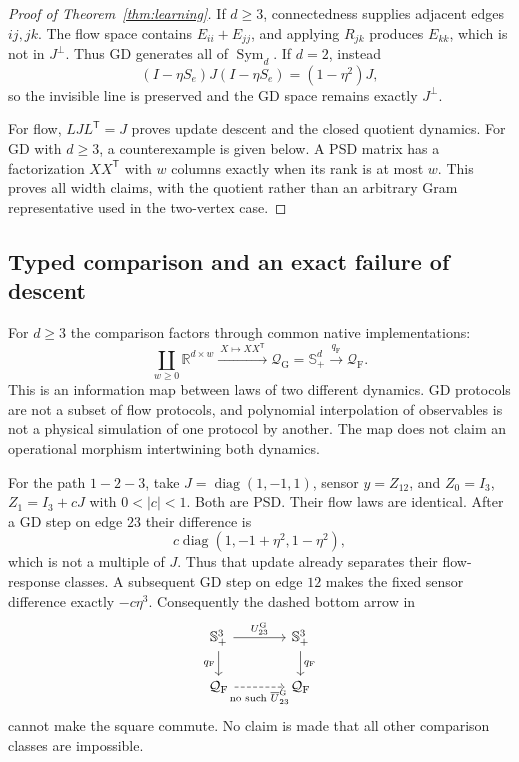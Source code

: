 \documentclass[11pt]{article}
\theoremstyle{remark}
\newcommand{\RR}{\mathbb R}
\newcommand{\Sym}{\operatorname{Sym}}
\newcommand{\diag}{\operatorname{diag}}
\newcommand{\PSD}{\mathbb S_+}
\newcommand{\QQF}{\mathcal Q_{\mathrm F}}
\newcommand{\QQG}{\mathcal Q_{\mathrm G}}
\begin{document}
\begin{proof}[Proof of Theorem~\ref{thm:learning}]
If $d\geq3$, connectedness supplies adjacent edges $ij,jk$. The flow space contains $E_{ii}+E_{jj}$, and applying $R_{jk}$ produces $E_{kk}$, which is not in $J^\perp$. Thus GD generates all of $\Sym_d$. If $d=2$, instead
\[
 (I-\eta S_e)J(I-\eta S_e)=(1-\eta^2)J,
\]
so the invisible line is preserved and the GD space remains exactly $J^\perp$.

For flow, $LJL^{\mathsf T}=J$ proves update descent and the closed quotient dynamics. For GD with $d\geq3$, a counterexample is given below. A PSD matrix has a factorization $XX^{\mathsf T}$ with $w$ columns exactly when its rank is at most $w$. This proves all width claims, with the quotient rather than an arbitrary Gram representative used in the two-vertex case.
\end{proof}

\subsection{Typed comparison and an exact failure of descent}

For $d\geq3$ the comparison factors through common native implementations:
\[
 \coprod_{w\geq0}\RR^{d\times w}
 \xrightarrow{\ X\mapsto XX^{\mathsf T}\ }\QQG=\PSD^d
 \xrightarrow{\ q_{\mathrm F}\ }\QQF.
\]
This is an information map between laws of two different dynamics. GD protocols are not a subset of flow protocols, and polynomial interpolation of observables is not a physical simulation of one protocol by another. The map does not claim an operational morphism intertwining both dynamics.

For the path $1-2-3$, take $J=\diag(1,-1,1)$, sensor $y=Z_{12}$, and $Z_0=I_3$, $Z_1=I_3+cJ$ with $0<|c|<1$. Both are PSD. Their flow laws are identical. After a GD step on edge $23$ their difference is
\[
 c\diag(1,-1+\eta^2,1-\eta^2),
\]
which is not a multiple of $J$. Thus that update already separates their flow-response classes. A subsequent GD step on edge $12$ makes the fixed sensor difference exactly $-c\eta^3$. Consequently the dashed bottom arrow in
\[
\begin{tikzcd}[column sep=large]
\PSD^3 \arrow[r,"U^{\mathrm G}_{23}"] \arrow[d,"q_{\mathrm F}"'] &
\PSD^3 \arrow[d,"q_{\mathrm F}"]\\
\QQF \arrow[r,dashed,"\text{no such }\overline U^{\mathrm G}_{23}"'] & \QQF
\end{tikzcd}
\]
cannot make the square commute. No claim is made that all other comparison classes are impossible.
\end{document}
